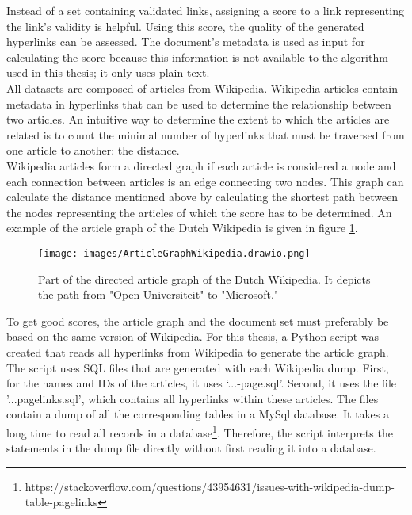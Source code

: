 Instead of a set containing validated links, assigning a score to a link representing the link's validity is helpful. Using this score, the quality of the generated hyperlinks can be assessed. The document's metadata is used as input for calculating the score because this information is not available to the algorithm used in this thesis; it only uses plain text.\\
All datasets are composed of articles from Wikipedia. Wikipedia articles contain metadata in hyperlinks that can be used to determine the relationship between two articles. An intuitive way to determine the extent to which the articles are related is to count the minimal number of hyperlinks that must be traversed from one article to another: the distance. \\
Wikipedia articles form a directed graph if each article is considered a node and each connection between articles is an edge connecting two nodes. This graph can calculate the distance mentioned above by calculating the shortest path between the nodes representing the articles of which the score has to be determined. An example of the article graph of the Dutch Wikipedia is given in figure \ref{imgArticleGraph}.\\

\begin{figure}[h]
\centering
\captionsetup{justification=centering}
\texttt{[image: images/ArticleGraphWikipedia.drawio.png]}
\caption{Part of the directed article graph of the Dutch Wikipedia. It depicts the path from "Open Universiteit" to "Microsoft."}
\label{imgArticleGraph}
\end{figure}


To get good scores, the article graph and the document set must preferably be based on the same version of Wikipedia. For this thesis, a Python script was created that reads all hyperlinks from Wikipedia to generate the article graph. The script uses SQL files that are generated with each Wikipedia dump. First, for the names and IDs of the articles, it uses `...-page.sql'. Second,  it uses the file '...pagelinks.sql', which contains all hyperlinks within these articles. The files contain a dump of all the corresponding tables in a MySql database. It takes a long time to read all records in a database\footnote{https://stackoverflow.com/questions/43954631/issues-with-wikipedia-dump-table-pagelinks}. Therefore, the script interprets the statements in the dump file directly without first reading it into a database.\\

